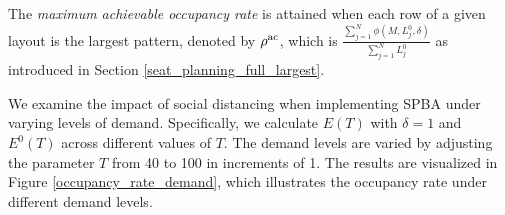 The \textit{maximum achievable occupancy rate} is attained when each row of a given layout is the largest pattern, denoted by $\rho^{\textup{ac}}$, which is $\frac{\sum_{j =1}^{N}\phi(M, L_{j}^{0}, \delta)}{\sum_{j =1}^{N} L_{j}^{0}}$ as introduced in Section \ref{seat_planning_full_largest}.

We examine the impact of social distancing when implementing SPBA under varying levels of demand.  Specifically, we calculate $E(T)$ with $\delta = 1$ and $E^{0}(T)$ across different values of $T$. The demand levels are varied by adjusting the parameter $T$ from 40 to 100 in increments of 1. The results are visualized in Figure \ref{occupancy_rate_demand}, which illustrates the occupancy rate under different demand levels.





